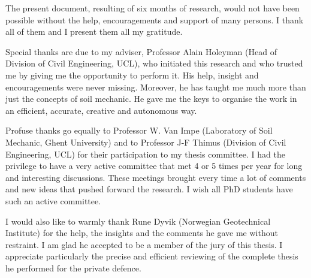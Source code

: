 \begin{acknowledgements}
\addchaptertocentry{\acknowledgementname} 
The present document, resulting of six months of research, would not have been possible without the help, encouragements and support of many persons. I thank all of them and I present them all my gratitude.

\medskip

Special thanks are due to my adviser, Professor Alain Holeyman  (Head of Division of Civil Engineering, UCL), who initiated  this research and who trusted me by giving me the opportunity to perform it. His help, insight and encouragements were never  missing. Moreover, he has taught me much more than just the  concepts  of  soil mechanic. He gave me the keys to organise the work in an efficient, accurate, creative
and autonomous way.

\medskip

Profuse  thanks  go  equally  to  Professor  W.  Van  Impe  (Laboratory  of  Soil
Mechanic,   Ghent   University)   and   to   Professor   J-F   Thimus   (Division   of   Civil
Engineering,  UCL)  for  their  participation  to  my  thesis  committee.  I  had  the  privilege
to have a very active committee that met 4 or 5 times per year for long and interesting
discussions. These meetings brought every time a lot of comments and new ideas that
pushed forward the research. I wish all PhD students have such an active committee.

\medskip

I  would  also  like  to  warmly  thank  Rune  Dyvik  (Norwegian  Geotechnical
Institute)  for  the  help,  the  insights  and  the  comments  he  gave  me  without  restraint.  I
am glad he accepted to be a member of the jury of this thesis. I appreciate particularly
the precise and efficient reviewing of the complete thesis he performed for the private
defence.
\end{acknowledgements}
